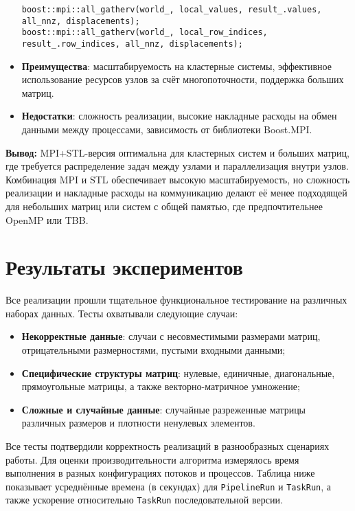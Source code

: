 \documentclass[12pt]{extarticle}
\begin{document}
\begin{itemize}
    \begin{lstlisting}[caption={Сбор глобальных результатов в методе GatherGlobalResults},label={lst:mpi_gather}]
boost::mpi::all_gatherv(world_, local_values, result_.values, all_nnz, displacements);
boost::mpi::all_gatherv(world_, local_row_indices, result_.row_indices, all_nnz, displacements);
    \end{lstlisting}
    \item \textbf{Преимущества}: масштабируемость на кластерные системы, эффективное использование ресурсов узлов за счёт многопоточности, поддержка больших матриц.
    \item \textbf{Недостатки}: сложность реализации, высокие накладные расходы на обмен данными между процессами, зависимость от библиотеки Boost.MPI.
\end{itemize}

\textbf{Вывод:} MPI+STL-версия оптимальна для кластерных систем и больших матриц, где требуется распределение задач между узлами и параллелизация внутри узлов. Комбинация MPI и STL обеспечивает высокую масштабируемость, но сложность реализации и накладные расходы на коммуникацию делают её менее подходящей для небольших матриц или систем с общей памятью, где предпочтительнее OpenMP или TBB.

\newpage
\section{Результаты экспериментов}

\hspace*{1.25cm}Все реализации прошли тщательное функциональное тестирование на различных наборах данных. Тесты охватывали следующие случаи:
\begin{itemize}
  \item \textbf{Некорректные данные}: случаи с несовместимыми размерами матриц, отрицательными размерностями, пустыми входными данными; \\[-0.9cm]
  \item \textbf{Специфические структуры матриц}: нулевые, единичные, диагональные, прямоугольные матрицы, а также векторно-матричное умножение; \\[-0.9cm]
  \item \textbf{Сложные и случайные данные}: случайные разреженные матрицы различных размеров и плотности ненулевых элементов. 
\end{itemize}

Все тесты подтвердили корректность реализаций в разнообразных сценариях работы. Для оценки производительности алгоритма измерялось время выполнения в разных конфигурациях потоков и процессов. Таблица ниже показывает усреднённые времена (в секундах) для \texttt{PipelineRun} и \texttt{TaskRun}, а также ускорение относительно \texttt{TaskRun} последовательной версии.
\end{document}
